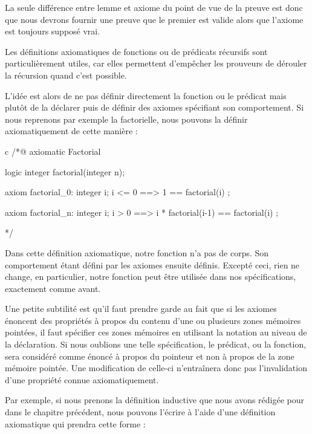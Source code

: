 La seule différence entre lemme et axiome du point de vue de la preuve est donc
que nous devrons fournir une preuve que le premier est valide alors que l'axiome
est toujours supposé vrai.





Les définitions axiomatiques de fonctions ou de prédicats récursifs sont
particulièrement utiles, car elles permettent d'empêcher les prouveurs de
dérouler la récursion quand c'est possible.



L'idée est alors de ne pas définir directement la fonction ou le prédicat mais
plutôt de la déclarer puis de définir des axiomes spécifiant son comportement.
Si nous reprenons par exemple la factorielle, nous pouvons la définir
axiomatiquement de cette manière :



\begin{CodeBlock}{c}
/*@
  axiomatic Factorial{
    logic integer factorial(integer n);

    axiom factorial_0:
      \forall integer i; i <= 0 ==> 1 == factorial(i) ;

    axiom factorial_n:
      \forall integer i; i > 0 ==> i * factorial(i-1) == factorial(i) ;
  }
*/
\end{CodeBlock}



Dans cette définition axiomatique, notre fonction n'a pas de corps. Son
comportement étant défini par les axiomes ensuite définis. Excepté ceci,
rien ne change, en particulier, notre fonction peut être utilisée dans nos
spécifications, exactement comme avant.


Une petite subtilité
est qu'il faut prendre garde au fait que si les axiomes énoncent des propriétés
à propos du contenu d'une ou plusieurs zones mémoires pointées, il faut
spécifier ces zones mémoires en utilisant la notation  au niveau de
la déclaration. Si nous oublions une telle spécification, le prédicat, ou la
fonction, sera considéré comme énoncé à propos du pointeur et non à propos de la
zone mémoire pointée. Une modification de celle-ci n'entraînera donc pas
l'invalidation d'une propriété connue axiomatiquement.


Par exemple, si nous prenons la définition inductive que nous avons rédigée pour
 dans le chapitre précédent, nous pouvons l'écrire à l'aide
d'une définition axiomatique qui prendra cette forme :



